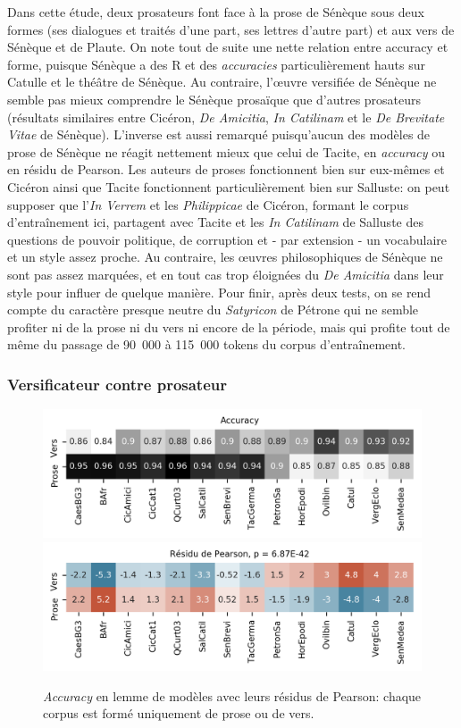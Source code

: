 Dans cette étude, deux prosateurs font face à la prose de Sénèque sous deux formes (ses dialogues et traités d'une part, ses lettres d'autre part) et aux vers de Sénèque et de Plaute. On note tout de suite une nette relation entre accuracy et forme, puisque Sénèque a des R et des \textit{accuracies} particulièrement hauts sur Catulle et le théâtre de Sénèque. Au contraire, l'œuvre versifiée de Sénèque ne semble pas mieux comprendre le Sénèque prosaïque que d'autres prosateurs (résultats similaires entre Cicéron, \textit{De Amicitia}, \textit{In Catilinam} et le \textit{De Brevitate Vitae} de Sénèque). L'inverse est aussi remarqué puisqu'aucun des modèles de prose de Sénèque ne réagit nettement mieux que celui de Tacite, en \textit{accuracy} ou en résidu de Pearson. Les auteurs de proses fonctionnent bien sur eux-mêmes et Cicéron ainsi que Tacite fonctionnent particulièrement bien sur Salluste: on peut supposer que l'\textit{In Verrem} et les \textit{Philippicae} de Cicéron, formant le corpus d'entraînement ici, partagent avec Tacite et les \textit{In Catilinam} de Salluste des questions de pouvoir politique, de corruption et - par extension - un vocabulaire et un style assez proche. Au contraire, les œuvres philosophiques de Sénèque ne sont pas assez marquées, et en tout cas trop éloignées du \textit{De Amicitia} dans leur style pour influer de quelque manière. Pour finir, après deux tests, on se rend compte du caractère presque neutre du \textit{Satyricon} de Pétrone qui ne semble profiter ni de la prose ni du vers ni encore de la période, mais qui profite tout de même du passage de 90~000 à 115~000 tokens du corpus d'entraînement.

\subsubsection{Versificateur contre prosateur}

\begin{figure}[ht]
    \centering
    \includegraphics[width=0.7\linewidth]{results/lemmatisation/longreeVariante/LongreeVariante-AccuracyModeDExpression-Lemme.png}
    \includegraphics[width=0.7\linewidth]{results/lemmatisation/longreeVariante/LongreeVariante-AssocPlotModeDExpression-Lemme.png}
    \caption{\textit{Accuracy} en lemme de modèles avec leurs résidus de Pearson: chaque corpus est formé uniquement de prose ou de vers.}
    \label{fig:lemmatisation:longree:proseVSvers}
\end{figure}

